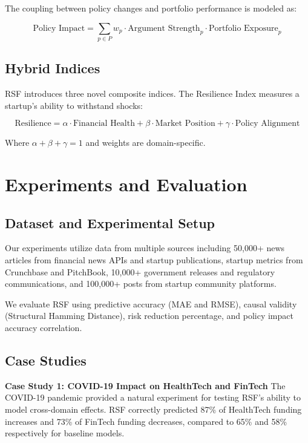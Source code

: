 \documentclass[conference]{IEEEtran}
\begin{document}
The coupling between policy changes and portfolio performance is modeled as:

\begin{equation}
\text{Policy Impact} = \sum_{p \in P} w_p \cdot \text{Argument Strength}_p \cdot \text{Portfolio Exposure}_p
\end{equation}

\subsection{Hybrid Indices}

RSF introduces three novel composite indices. The Resilience Index measures a startup's ability to withstand shocks:

\begin{equation}
\text{Resilience} = \alpha \cdot \text{Financial Health} + \beta \cdot \text{Market Position} + \gamma \cdot \text{Policy Alignment}
\end{equation}

Where $\alpha + \beta + \gamma = 1$ and weights are domain-specific.

\section{Experiments and Evaluation}

\subsection{Dataset and Experimental Setup}

Our experiments utilize data from multiple sources including 50,000+ news articles from financial news APIs and startup publications, startup metrics from Crunchbase and PitchBook, 10,000+ government releases and regulatory communications, and 100,000+ posts from startup community platforms.

We evaluate RSF using predictive accuracy (MAE and RMSE), causal validity (Structural Hamming Distance), risk reduction percentage, and policy impact accuracy correlation.

\subsection{Case Studies}

\textbf{Case Study 1: COVID-19 Impact on HealthTech and FinTech}
The COVID-19 pandemic provided a natural experiment for testing RSF's ability to model cross-domain effects. RSF correctly predicted 87\% of HealthTech funding increases and 73\% of FinTech funding decreases, compared to 65\% and 58\% respectively for baseline models.
\end{document}
